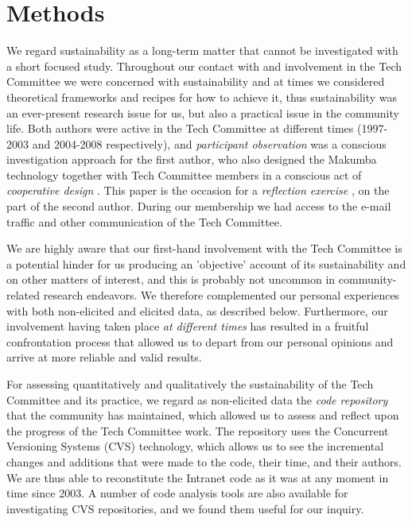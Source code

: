 \documentclass{acm_proc_article-sp}
\begin{document}
\section{Methods}\label{sec:method}
We regard sustainability as a long-term matter that cannot be investigated with a short focused study. Throughout our contact with and involvement in the Tech Committee we were concerned with sustainability and at times we considered  theoretical frameworks and recipes for how to achieve it, thus sustainability was an ever-present research issue for us, but also a practical issue in the community life. Both authors were active in the Tech Committee at different times (1997-2003 and 2004-2008 respectively), and {\it participant observation} was a conscious investigation approach for the first author, who also designed the Makumba technology together with Tech Committee members in a conscious act of {\it cooperative design} \cite{greenbaum_kyng91} . This paper is the occasion for a {\it reflection exercise} \cite{schon83}, on the part of the second author. During our membership we had access to the e-mail traffic and other communication of the Tech Committee. 

We are highly aware that our first-hand involvement with the Tech Committee is a potential hinder for us producing an 'objective' account of its sustainability and on other matters of interest, and this is probably not uncommon in community-related research endeavors. We therefore complemented our personal experiences with both non-elicited and elicited data, as described below. Furthermore, our involvement having taken place {\it at different times} has resulted in a fruitful confrontation process that allowed us to depart from our personal opinions and arrive at more reliable and valid results.

For assessing quantitatively and qualitatively the sustainability of the Tech Committee and its practice, we regard as non-elicited data the {\it code repository} that the community has maintained, which allowed us to assess and reflect upon the progress of the Tech Committee work. The repository uses the Concurrent Versioning Systems (CVS) technology, which allows us to see the incremental changes and additions that were made to the code, their time, and their authors. We are thus able to reconstitute the Intranet code as it was at any moment in time since 2003. A number of code analysis tools are also available for investigating CVS repositories, and we found them useful for our inquiry.
\end{document}
